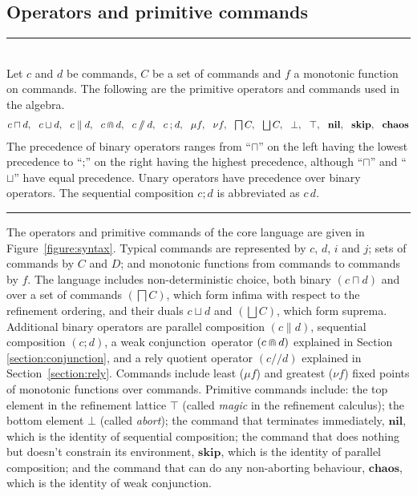 \documentclass[fleqn]{fac}
\newcommand{\figurerule}{\rule{\textwidth}{0.5pt}}
\newcommand{\Seq}{\mathbin{;}}
\newcommand{\SSeq}{\,}
\newcommand{\Nil}{\Keyword{nil}}
\newcommand{\Altx}{,~~}
\newcommand{\nondet}{\mathbin{\sqcap}}
\newcommand{\Nondet}{\mathop{\textstyle\bigsqcap}}
\newcommand{\angelic}{\mathbin{\sqcup}}
\newcommand{\Angelic}{\mathop{\textstyle\bigsqcup}}
\newcommand{\strictconjunction}{weak conjunction}
\newcommand{\together}{\mathbin{\doublecap}}
\newcommand{\quotient}{\mathbin{/\!\!/}}
\newcommand{\Keyword}[1]{\mathsf{\mathbf{#1}}}
\newcommand{\Magic}{\Keyword{\top}}
\newcommand{\Abort}{\Keyword{\bot}}
\newcommand{\Chaos}{\Keyword{chaos}}
\newcommand{\Skip}{\Keyword{skip}}
\begin{document}
\subsection{Operators and primitive commands}\label{section:syntax}

\begin{figure*}
\figurerule\\
Let $c$ and $d$ be commands, $C$ be a set of commands and $f$ a monotonic function on commands.
The following are the primitive operators and commands used in the algebra.
\begin{eqnarray*}
                       c \nondet d 
                 \Altx c \angelic d  
                 \Altx c \parallel d 
                 \Altx c \together d 
                 \Altx c \quotient d
                 \Altx c \Seq d 
                 \Altx \mu f
                 \Altx \nu f
                 \Altx \Nondet C 
                 \Altx \Angelic C 
                 \Altx \Abort 
                 \Altx \Magic 
                 \Altx \Nil 
                 \Altx \Skip
                 \Altx \Chaos 
\end{eqnarray*}
The precedence of binary operators ranges 
from ``$\nondet$'' on the left having the lowest precedence
to ``$\Seq$'' on the right having the highest precedence,
although ``$\nondet$'' and ``$\angelic$'' have equal precedence.
Unary operators have precedence over binary operators.
The sequential composition $c \Seq d$ is abbreviated as $c \SSeq d$.

\figurerule
\caption{Operators and primitive commands}\label{figure:syntax}
\end{figure*}


The operators and primitive commands of the core language are given in Figure~\ref{figure:syntax}.
Typical 
commands are represented by $c$, $d$, $i$ and $j$;
sets of commands by $C$ and $D$;
and
monotonic functions from commands to commands by $f$.
The language includes non-deterministic choice, 
both binary $(c \nondet d)$ and over a set of commands $(\Nondet C)$, 
which form infima with respect to the refinement ordering,
and their duals $c \angelic d$ and $(\Angelic C)$,
which form suprema.
Additional binary operators are 
parallel composition $(c \parallel d)$, 
sequential composition $(c \Seq d)$,
a \strictconjunction\ operator $(c \together d)$ explained in Section \ref{section:conjunction},
and
a rely quotient operator $(c \quotient d)$ explained in Section~\ref{section:rely}.
Commands include least ($\mu f$) and greatest ($\nu f$) fixed points of monotonic functions over commands.
Primitive commands include:
the top element in the refinement lattice $\Magic$ 
(called \emph{magic} in the refinement calculus);
the bottom element $\Abort$ 
(called \emph{abort});
the command that terminates immediately, $\Nil$,
which is the identity of sequential composition;
the command that does nothing but doesn't constrain its environment, $\Skip$,
which is the identity of parallel composition;
and
the command that can do any non-aborting behaviour, $\Chaos$,
which is the identity of \strictconjunction.
\end{document}
